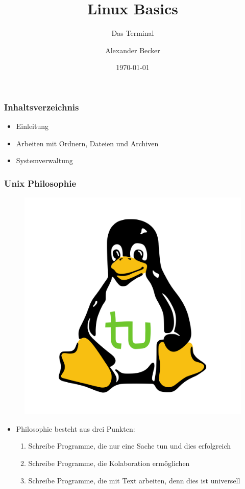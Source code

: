 \documentclass[12pt,utf8]{beamer}
\title{Linux Basics}
\subtitle{Das Terminal}
\author{Alexander Becker}
\institute[FOSS AG]{Free and Open Source Software AG\\ Fakultät für Informatik}
\date{\today}
\begin{document}
\begin{frame}
	\titlepage
\end{frame}

\begin{frame}
\frametitle{Inhaltsverzeichnis}
\begin{itemize}
	\item Einleitung
	\item Arbeiten mit Ordnern, Dateien und Archiven
	\item Systemverwaltung
\end{itemize}
\end{frame}

\begin{frame}
\frametitle{Unix Philosophie}
\begin{figure}
\includegraphics[scale=0.15]{res/tuX_tu.png}
\end{figure}
\begin{itemize}
	\item Philosophie besteht aus drei Punkten:
	\begin{enumerate}
		\item Schreibe Programme, die nur eine Sache tun und dies erfolgreich
		\item Schreibe Programme, die Kolaboration ermöglichen
		\item Schreibe Programme, die mit Text arbeiten, denn dies ist universell
	\end{enumerate}
\end{itemize}
\end{frame}
\end{document}
